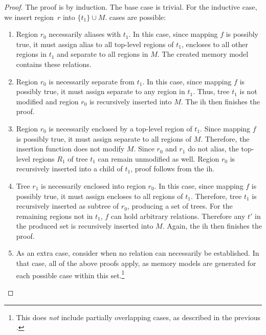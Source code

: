 \begin{proof}
  The proof is by induction.
  The base case is trivial.
  For the inductive case, we insert region~$r$ into $\{t_1\} \cup M$.
   cases are possible:
  \begin{enumerate}
    \item Region $r_0$ necessarily aliases with $t_1$.
    In this case, since mapping $f$ is possibly true, it must assign \gls{alias} to all top-level regions of $t_1$, \gls{encloses} to all other regions in $t_1$ and \gls{separate} to all regions in $M$.
    The created memory model contains these relations.
    \item Region $r_0$ is necessarily separate from $t_1$.
    In this case, since mapping $f$ is possibly true, it must assign \gls{separate} to any region in $t_1$.
    Thus, tree $t_1$ is not modified and region $r_0$ is recursively inserted into $M$.
    The \ac{ih} then finishes the proof.
    \item Region $r_0$ is necessarily enclosed by a top-level region of $t_1$.
    Since mapping $f$ is possibly true, it must assign \gls{separate} to all regions of $M$.
    Therefore, the insertion function does not modify $M$.
    Since $r_0$ and $r_1$ do not alias, the top-level regions $R_1$ of tree $t_1$ can remain unmodified as well.
    Region $r_0$ is recursively inserted into a child of $t_1$, proof follows from the \ac{ih}.
    \item Tree $r_1$ is necessarily enclosed into region $r_0$.
    In this case, since mapping $f$ is possibly true, it must assign \gls{encloses} to all regions of $t_1$.
    Therefore, tree $t_1$ is recursively inserted as subtree of $r_0$, producing a set of trees.
    For the remaining regions not in $t_1$, $f$ can hold arbitrary relations.
    Therefore any $t'$ in the produced set is recursively inserted into $M$.
    Again, the \ac{ih} then finishes the proof.
    \item As an extra case, consider when no relation can necessarily be established. In that case, all of the above proofs apply, as memory models are generated for each possible case within this set.\footnote{%
      This does \emph{not} include partially overlapping cases, as described in the previous .%
    } \qedhere
  \end{enumerate}
\end{proof}

